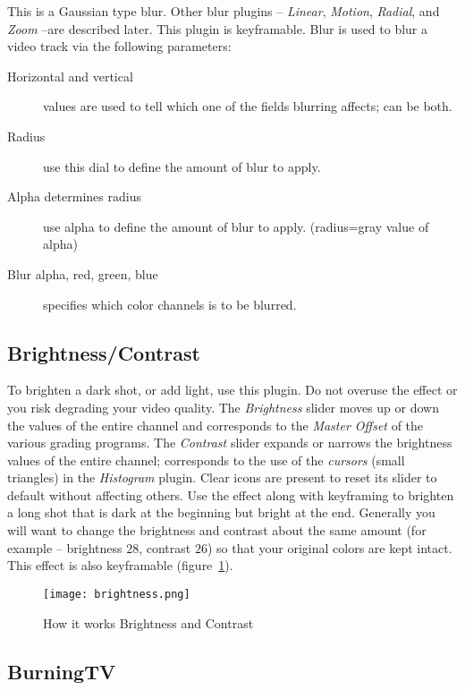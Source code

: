 This is a Gaussian type blur. Other blur plugins -- \textit{Linear}, \textit{Motion}, \textit{Radial}, and \textit{Zoom} --are described later. This plugin is keyframable. Blur is used to blur a video track via the following parameters:
\begin{description}
    \item[Horizontal and vertical] values are used to tell which one of the fields blurring affects; can be both.
    \item[Radius] use this dial to define the amount of blur to apply.
    \item[Alpha determines radius] use alpha to define the amount of blur to apply. (radius=gray value of alpha)
    \item[Blur alpha, red, green, blue] specifies which color channels is to be blurred.
\end{description}

\subsection{Brightness/Contrast}%
\label{sub:brightness_contrast}

To brighten a dark shot, or add light, use this plugin. Do not overuse the effect or you risk degrading your video quality.
The \textit{Brightness} slider moves up or down the values of the entire channel and corresponds to the \textit{Master Offset} of the various grading programs.
The \textit{Contrast} slider expands or narrows the brightness values of the entire channel; corresponds to the use of the \textit{cursors} (small triangles) in the \textit{Histogram} plugin. Clear icons are present to reset its slider to default without affecting others.
Use the effect along with keyframing to brighten a long shot that is dark at the beginning but bright at the end. Generally you will want to change the brightness and contrast about the same amount (for example -- brightness $28$, contrast $26$) so that your original colors are kept intact. This effect is also keyframable (figure~\ref{fig:brightness}).

\begin{figure}[htpb]
    \centering
    \texttt{[image: brightness.png]}
    \caption{How it works Brightness and Contrast}
    \label{fig:brightness}
\end{figure}

\subsection{BurningTV}%
\label{sub:burningtv}


